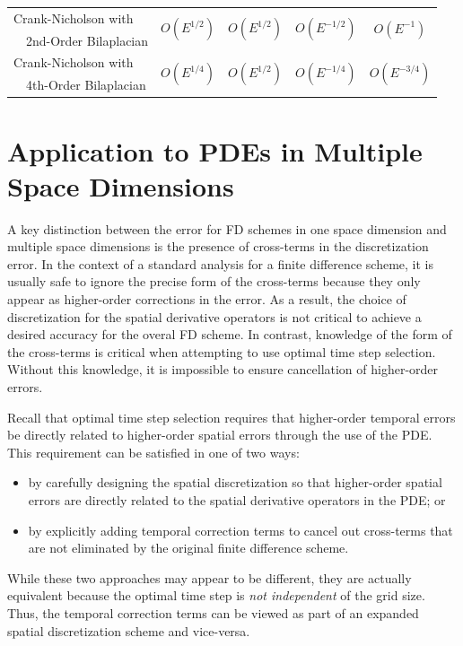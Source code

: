 \documentclass[oneeqnum,onefignum,onetabnum,onethmnum]{siamltex}
\begin{document}
\begin{table}[tbh]
\begin{minipage}{\textwidth}
\begin{center}
\begin{tabular}{|l|c|c|c|c|}
  \hline 
  Crank-Nicholson with 
    & \multirow{2}{*}{$O\left( E^{1/2} \right)$} 
    & \multirow{2}{*}{$O\left( E^{1/2} \right)$} 
    & \multirow{2}{*}{$O\left( E^{-1/2} \right)$} 
    & \multirow{2}{*}{$O\left( E^{-1} \right)$} \\
  \ \ 2nd-Order Bilaplacian & & & & \\
  \hline 
  Crank-Nicholson with 
    & \multirow{2}{*}{$O\left( E^{1/4} \right)$} 
    & \multirow{2}{*}{$O\left( E^{1/2} \right)$} 
    & \multirow{2}{*}{$O\left( E^{-1/4} \right)$} 
    & \multirow{2}{*}{$O\left( E^{-3/4} \right)$} \\
  \ \ 4th-Order Bilaplacian & & & & \\
  \hline
\end{tabular}
\end{center}
\end{minipage}
\end{table}


\section{\label{sec:applications_multidim}
         Application to PDEs in Multiple Space Dimensions}
A key distinction between the error for FD schemes in one space dimension
and multiple space dimensions is the presence of cross-terms in the 
discretization error.  In the context of a standard analysis for a finite 
difference scheme, it is usually safe to ignore the precise form of the 
cross-terms because they only appear as higher-order corrections in the 
error.  As a result, the choice of discretization for the spatial derivative 
operators is not critical to achieve a desired accuracy for the overal FD 
scheme.  In contrast, knowledge of the form of the cross-terms is critical 
when attempting to use optimal time step selection.  Without this knowledge, 
it is impossible to ensure cancellation of higher-order errors.  

Recall that optimal time step selection requires that higher-order temporal 
errors be directly related to higher-order spatial errors through the use 
of the PDE.  This requirement can be satisfied in one of two ways:
\begin{itemize}
\item by carefully designing the spatial discretization so that 
      higher-order spatial errors are directly related to the spatial 
      derivative operators in the PDE; or
\item by explicitly adding temporal correction terms to cancel out cross-terms 
      that are not eliminated  by the original finite difference scheme.
\end{itemize}
While these two approaches may appear to be different, they are actually 
equivalent because the optimal time step is \emph{not independent} of the 
grid size.  Thus, the temporal correction terms can be viewed as part of
an expanded spatial discretization scheme and vice-versa.
\end{document}
